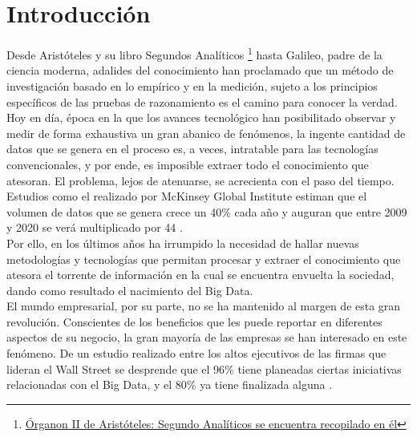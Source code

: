 
\pagestyle{fancy}

\chapter{Introducción}
\label{introduccion}

Desde Aristóteles y su libro Segundos Analíticos \footnote{\href{https://docs.google.com/a/datik.es/file/d/0By4kcbi6MzzdUHhVQnUtcTNUdk0/view}{Órganon II de Aristóteles: Segundo Analíticos se encuentra recopilado en él}} hasta Galileo, padre de la ciencia moderna, adalides del conocimiento han proclamado que un método de investigación basado en lo empírico y en la medición, sujeto a los principios específicos de las pruebas de razonamiento es el camino para conocer la verdad.\\

Hoy en día, época en la que los avances tecnológico han posibilitado observar y medir de forma exhaustiva un gran abanico de fenómenos, la ingente cantidad de datos que se genera en el proceso es, a veces, intratable para las tecnologías convencionales, y por ende, es imposible extraer todo el conocimiento que atesoran. El problema, lejos de atenuarse, se acrecienta con el paso del tiempo. Estudios como el realizado por McKinsey Global Institute estiman que el volumen de datos que se genera crece un 40\% cada año y auguran que entre 2009 y 2020 se verá multiplicado por 44 \cite{nambiartowards}.\\

Por ello, en los últimos años ha irrumpido la necesidad de hallar nuevas metodologías y tecnologías que permitan procesar y extraer el conocimiento que atesora el torrente de información en la cual se encuentra envuelta la sociedad, dando como resultado el nacimiento del Big Data.\\

El mundo empresarial, por su parte, no se ha mantenido al margen de esta gran revolución. Conscientes de los beneficios que les puede reportar en diferentes aspectos de su negocio, la gran mayoría de las empresas se han interesado en este fenómeno. De un estudio realizado entre los altos ejecutivos de las firmas que lideran el Wall Street se desprende que el 96\% tiene planeadas ciertas iniciativas relacionadas con el Big Data, y el 80\% ya tiene finalizada alguna \cite{bdes:2013}. 

